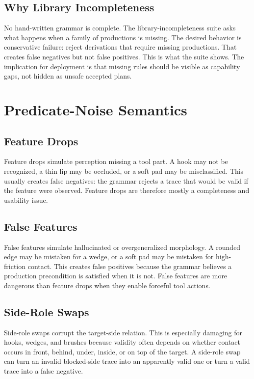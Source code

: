 \documentclass{article}
\begin{document}
\subsection{Why Library Incompleteness}

No hand-written grammar is complete. The library-incompleteness suite asks what happens when a family of productions is missing. The desired behavior is conservative failure: reject derivations that require missing productions. That creates false negatives but not false positives. This is what the suite shows. The implication for deployment is that missing rules should be visible as capability gaps, not hidden as unsafe accepted plans.

\section{Predicate-Noise Semantics}

\subsection{Feature Drops}

Feature drops simulate perception missing a tool part. A hook may not be recognized, a thin lip may be occluded, or a soft pad may be misclassified. This usually creates false negatives: the grammar rejects a trace that would be valid if the feature were observed. Feature drops are therefore mostly a completeness and usability issue.

\subsection{False Features}

False features simulate hallucinated or overgeneralized morphology. A rounded edge may be mistaken for a wedge, or a soft pad may be mistaken for high-friction contact. This creates false positives because the grammar believes a production precondition is satisfied when it is not. False features are more dangerous than feature drops when they enable forceful tool actions.

\subsection{Side-Role Swaps}

Side-role swaps corrupt the target-side relation. This is especially damaging for hooks, wedges, and brushes because validity often depends on whether contact occurs in front, behind, under, inside, or on top of the target. A side-role swap can turn an invalid blocked-side trace into an apparently valid one or turn a valid trace into a false negative.
\end{document}
